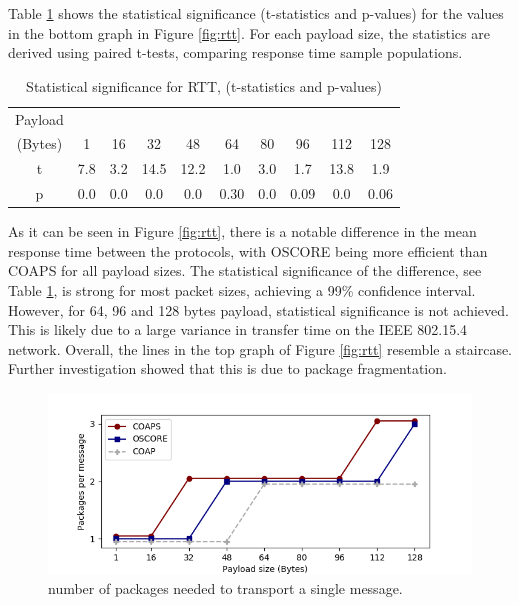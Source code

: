 {Table \ref{tab:tstat} shows the statistical significance (t-statistics and p-values) for the values in the bottom graph in Figure \ref{fig:rtt}. For each payload size, the statistics are derived using paired t-tests, comparing response time sample populations.

\begin{table}[ht]
\centering
\caption {Statistical significance for RTT, (t-statistics and p-values)} \label{tab:title} 
\small\addtolength{\tabcolsep}{-2pt}
\begin{tabular}{c|c|c|c|c|c|c|c|c|c}
Payload \\ (Bytes)  & 1    & 16   & 32   & 48   & 64   & 80   & 96   & 112  & 128  \\ \hline
                  t & 7.8  & 3.2  & 14.5 & 12.2 & 1.0  & 3.0  & 1.7  & 13.8 & 1.9  \\ 
                  p & 0.0 & 0.0 & 0.0 & 0.0    & 0.30 & 0.0 & 0.09 & 0.0 & 0.06
\end{tabular}
\label{tab:tstat}
\end{table}

As it can be seen in Figure \ref{fig:rtt}, there is a notable difference in the mean response time between the protocols, with OSCORE being more efficient than COAPS for all payload sizes. The statistical significance of the difference, see Table \ref{tab:tstat}, is strong for most packet sizes, achieving a 99\% confidence interval. However, for 64, 96 and 128 bytes payload, statistical significance is not achieved. This is likely due to a large variance in transfer time on the IEEE 802.15.4 network. Overall, the lines in the top graph of Figure \ref{fig:rtt} resemble a staircase. Further investigation showed that this is due to package fragmentation.

\begin{figure}
\centering
\includegraphics[width=1.0\textwidth]{papers/oscore/images/frags.png}
\caption[Fragmentation measurements]{number of packages needed to transport a single message. }
\label{fig:frag}
\end{figure}

}
